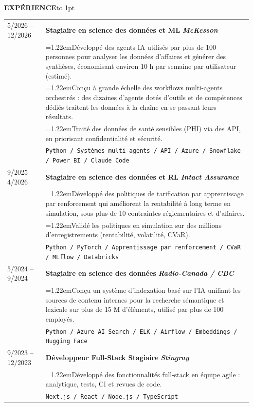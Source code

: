 \documentclass[a4paper,10pt]{article}
\newcommand{\sechead}[1]{\vspace{0.5em}\noindent\textbf{\large #1}\hspace{0.8em}\leaders\hbox to 1pt{\hss\raisebox{0.3em}{\rule{1pt}{0.4pt}}\hss}\hfill\null\par\vspace{0.45em}}
\newcommand{\bul}{\hangindent=1.22em\hangafter=1\hspace{0.5em}\textbullet\hspace{0.4em}}
\begin{document}
    \vspace{0.2em}
    \sechead{EXPÉRIENCE}
    
    \begin{tabularx}{\textwidth}{@{}p{3cm} X@{}}
        5/2026 -- 12/2026 &
        \textbf{Stagiaire en science des données et ML} \hfill \textbf{\textit{McKesson}}\\[0.2em]
        & \bul Développé des agents IA utilisés par plus de 100 personnes pour analyser les données d’affaires et générer des synthèses, économisant environ 10 h par semaine par utilisateur (estimé). \\
        & \bul Conçu à grande échelle des workflows multi-agents orchestrés : des dizaines d’agents dotés d’outils et de compétences dédiés traitent les données à la chaîne en se passant leurs résultats. \\
        & \bul Traité des données de santé sensibles (PHI) via des API, en priorisant confidentialité et sécurité. \\
        & \texttt{Python / Systèmes multi-agents / API / Azure / Snowflake / Power BI / Claude Code} \\[0.5em]

        9/2025 -- 4/2026 & 
        \textbf{Stagiaire en science des données et RL} \hfill \textbf{\textit{Intact Assurance}}\\[0.2em]
        & \bul Développé des politiques de tarification par apprentissage par renforcement qui améliorent la rentabilité à long terme en simulation, sous plus de 10 contraintes réglementaires et d’affaires.\\
        & \bul Validé les politiques en simulation sur des millions d’enregistrements (rentabilité, volatilité, CVaR).\\
        & \texttt{Python / PyTorch / Apprentissage par renforcement / CVaR / MLflow / Databricks} \\[0.5em]
        
        5/2024 -- 9/2024 & 
        \textbf{Stagiaire en science des données} \hfill \textbf{\textit{Radio-Canada / CBC}}\\[0.2em]
       & \bul Conçu un système d’indexation basé sur l’IA unifiant les sources de contenu internes pour la recherche sémantique et lexicale sur plus de 15 M d’éléments, utilisé par plus de 100 employés. \\
        & \texttt{Python / Azure AI Search / ELK / Airflow / Embeddings / Hugging Face} \\[0.5em]
    
        9/2023 -- 12/2023 & 
        \textbf{Développeur Full-Stack Stagiaire} \hfill \textbf{\textit{Stingray}}\\[0.2em]
        & \bul Développé des fonctionnalités full-stack en équipe agile : analytique, tests, CI et revues de code. \\
        & \texttt{Next.js / React / Node.js / TypeScript} \\[0.5em]
    \end{tabularx}
    
\end{document}
